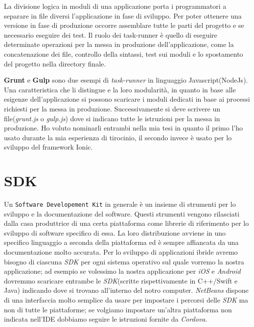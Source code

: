 La divisione logica in moduli di una applicazione porta i programmatori a separare in file diversi l'applicazione in fase di sviluppo. Per poter ottenere una versione in fase di produzione occorre assemblare tutte le parti del progetto e se necessario eseguire dei test.
Il ruolo dei task-runner è quello di eseguire determinate operazioni per la messa in produzione dell'applicazione, come la concatenazione dei file, controllo della sintassi, test sui moduli e lo spostamento del progetto nella directory finale.

\textbf{Grunt} e \textbf{Gulp} sono due esempi di \emph{task-runner} in linguaggio Javascript(NodeJs). Una caratteristica che li distingue e la loro modularità, in quanto in base alle esigenze dell'applicazione si possono scaricare i moduli dedicati in base ai processi richiesti per la messa in produzione. Successivamente si deve scrivere un file(\textit{grunt.js} o \textit{gulp.js}) dove si indicano tutte le istruzioni per la messa in produzione. Ho voluto nominarli entrambi nella mia tesi in quanto il primo l'ho usato durante la mia esperienza di tirocinio, il secondo invece è usato per lo sviluppo del framework Ionic.



\section{SDK}
Un \texttt{Software Developement Kit} in generale è un insieme di strumenti per lo sviluppo e la documentazione del software\cite{wiki:sdk}. Questi strumenti vengono rilasciati dalla casa produttrice di una certa piattaforma come librerie di riferimento per lo sviluppo di software specifico di essa. La loro distribuzione avviene in uno specifico linguaggio a seconda della piattaforma ed è sempre affiancata da una documentazione molto accurata. 
Per lo sviluppo di applicazioni ibride avremo bisogno di ciascuna \emph{SDK} per ogni sistema operativo sul quale vorremo la nostra applicazione; ad esempio se volessimo la nostra applicazione per \emph{iOS} e \emph{Android} dovremmo scaricare entrambe le \emph{SDK}(scritte rispettivamente in C++/Swift e Java) indicando dove si trovano all'interno del notro computer. \emph{NetBeans} dispone di una interfaccia molto semplice da usare per impostare i percorsi delle \emph{SDK} ma non di tutte le piattaforme; se volgiamo impostare un'altra piattaforma non indicata nell'IDE dobbiamo seguire le istruzioni fornite da \emph{Cordova}.
